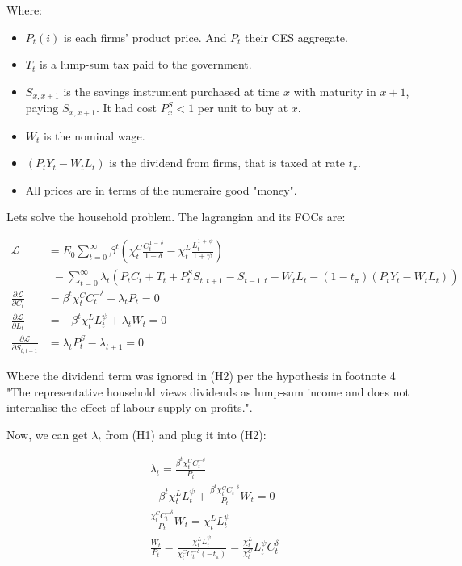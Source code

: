 \documentclass[12pt]{article}
\begin{document}
Where:

\begin{itemize}
    \item $P_t(i)$ is each firms' product price. And $P_t$ their CES aggregate.
    \item $T_t$ is a lump-sum tax paid to the government.
    \item $S_{x,x+1}$ is the savings instrument purchased at time $x$ with maturity in $x+1$, paying $S_{x,x+1}$. It had cost $P^S_x < 1$ per unit to buy at $x$.
    \item $W_t$ is the nominal wage.
    \item $(P_tY_t - W_tL_t)$ is the dividend from firms, that is taxed at rate $t_\pi$.
    \item All prices are in terms of the numeraire good "money".
\end{itemize}

Lets solve the household problem. The lagrangian and its FOCs are:

\begin{align*}
    \mathcal{L} &= E_{0}\sum_{t=0}^{\infty}\beta^{t}\left(\chi_{t}^{C}\frac{C_{t}^{1\,-\,\delta}}{1-\delta}-\chi_{t}^{L}\frac{L_{t}^{1\,+\,\psi}}{1+\psi}\right)\\
    &~~ - \sum_{t = 0}^\infty\lambda_t(P_tC_t + T_t + P^S_tS_{t,t+1} - S_{t-1,t} - W_tL_t - (1-t_\pi)(P_tY_t - W_tL_t))\\
    \frac{\partial\mathcal{L}}{\partial C_t} &= \beta^t\chi_t^C C_t^{-\delta} - \lambda_tP_t = 0 \tag{H1}\\
    \frac{\partial\mathcal{L}}{\partial L_t} &= -\beta^t\chi_t^L L_t^{\psi} + \lambda_tW_t = 0 \tag{H2}\\
    \frac{\partial\mathcal{L}}{\partial S_{t,t+1}} &= \lambda_tP^S_t - \lambda_{t+1} = 0 \tag{H3}
\end{align*}

Where the dividend term was ignored in (H2) per the hypothesis in footnote 4 "The representative household views dividends as lump-sum income and does not internalise the effect of labour supply on profits.".

Now, we can get $\lambda_t$ from (H1) and plug it into (H2):

\begin{align*}
    &\lambda_t = \frac{\beta^t\chi_t^C C_t^{-\delta}}{P_t}\\
    &-\beta^t\chi_t^L L_t^{\psi} + \frac{\beta^t\chi_t^C C_t^{-\delta}}{P_t}W_t = 0\\
    &\frac{\chi_t^C C_t^{-\delta}}{P_t}W_t = \chi_t^L L_t^{\psi}\\
    &\frac{W_t}{P_t} = \frac{\chi_t^L L_t^{\psi}}{\chi_t^C C_t^{-\delta}(-t_\pi)} = \frac{\chi_t^L }{\chi_t^C}L_t^{\psi}C_t^{\delta} \tag{5}
\end{align*}
\end{document}
